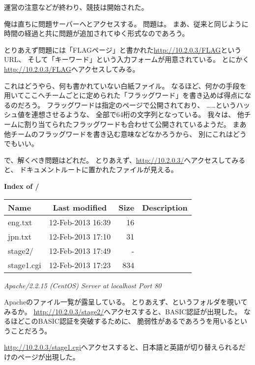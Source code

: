 運営の注意などが終わり、競技は開始された。

俺は直ちに問題サーバーへとアクセスする。
問題は。
まあ、従来と同じように時間の経過と共に問題が追加されてゆく形式なのであろう。

とりあえず問題には「FLAGページ」と書かれた\url{http://10.2.0.3/FLAG}というURL、
そして「キーワード」という入力フォームが用意されている。
とにかく\url{http://10.2.0.3/FLAG}へアクセスしてみる。

これはどうやら、何も書かれていない白紙ファイル。
なるほど、何かの手段を用いてここへチームごとに定められた「フラッグワード」を書き込めば得点になるのだろう。
フラッグワードは指定のページで公開されており、
……というハッシュ値を連想させるような、
全部で64桁の文字列となっている。
我々は、
他チームに割り当てられたフラッグワードも合わせて公開されているようだ。
まあ他チームのフラッグワードを書き込む意味などなかろうから、
別にこれはどうでもいい。

で、解くべき問題はどれだ。
とりあえず、\url{http://10.2.0.3/}へアクセスしてみると、
ドキュメントルートに置かれたファイルが見える。

\begin{itembox}[c]{\textbf{Index of /}}
\small
\begin{table}[H]
	\footnotesize
	\begin{tabular}{lcrl}
		\hfill Name & Last modified & Size & Description \\
		\hline
		eng.txt & 12-Feb-2013 16:39 & 16 \\
		jpn.txt & 12-Feb-2013 17:10 & 31 \\
		stage2/ & 12-Feb-2013 17:49 & -  \\
		stage1.cgi & 12-Feb-2013 17:23 & 834 \\
		\hline
	\end{tabular}
\end{table}
\textit{Apache/2.2.15 (CentOS) Server at localhost Port 80}
\end{itembox}

Apacheのファイル一覧が露呈している。
とりあえず、というフォルダを覗いてみるか。
\url{http://10.2.0.3/stage2/}へアクセスすると、BASIC認証が出現した。
なるほどこのBASIC認証を突破するために、
脆弱性があるであろうを用いるということだろう。

\url{http://10.2.0.3/stage1.cgi}へアクセスすると、日本語と英語が切り替えられるだけのページが出現した。




